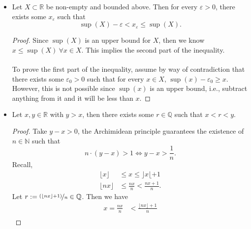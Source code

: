 \documentclass{article}
\newcommand{\Q}{\mathbb{Q}}
\newcommand{\R}{\mathbb{R}}
\newcommand{\N}{\mathbb{N}}
\newcommand{\set}[2]{\{ #1 \mid #2 \}}
\newcommand{\?}{\stackrel{?}{=}}
\theoremstyle{definition} %
\begin{document}
\begin{itemize}
    $$n \cdot x > y.$$
    \begin{proof}
        By way of contradiction, assume that $n \cdot x \leq y \ \forall n \in \N_*$ (for some $x > 0, y \geq 0)$. Then let $S = \set{n \cdot x}{n \in \N_*} \subset \R$. Clearly $S$ is bounded above by $y$ and $S$ is non-empty. This implies that $\sup(S)$ exists and $n \cdot x \leq \sup(s) \ \forall n \in \N_*$. This all implies that $(m + 1) \cdot x \leq \sup(S) \ \forall m \in \N_*$
    \end{proof}
    \item[]
    \begin{lemma}
        Let $X \subset \R$ be non-empty and bounded above. Then for every $\varepsilon > 0$, there exists some $x_\varepsilon$ such that
    $$\sup(X) - \varepsilon < x_\varepsilon \leq \sup(X).$$
    \end{lemma}
    \begin{proof}
        Since $\sup(X)$ is an upper bound for $X$, then we know $x \leq \sup(X) \ \forall x \in X$. This implies the second part of the inequality. \\\\
        To prove the first part of the inequality, assume by way of contradiction that there exists some $\varepsilon_0 > 0$ such that for every $x \in X$, $\sup(x) - \varepsilon_0 \geq x$. However, this is not possible since $\sup(x)$ is an upper bound, i.e., subtract anything from it and it will be less than $x$.
    \end{proof}
    \item[]
    \begin{lemma}
        Let $x, y \in \R$ with $y > x$, then there exists some $r \in \Q$ such that $x < r < y$.
    \end{lemma}
    \begin{proof}
        Take $y - x > 0$, the Archimidean principle guarantees the existence of $n \in \N$ such that
        $$n \cdot (y - x) > 1 \iff y - x > \frac{1}{n}.$$
        Recall,
        \begin{align*}
            \lfloor x \rfloor &\leq x \leq \rfloor x \lfloor + 1 \\
            \lfloor nx \rfloor &\leq \frac{nx}{n} < \frac{nx + 1}{n}.
        \end{align*}
        Let $r := \nicefrac{(\lfloor nx \rfloor + 1)}{n} \in \Q$. Then we have
        \begin{align*}
            x = \frac{nx}{n} &< \frac{\lfloor nx \rfloor + 1}{n} \\

\end{align*}
\end{proof}
\end{itemize}
\end{document}
